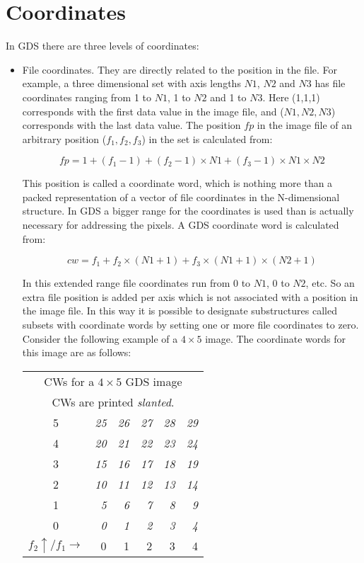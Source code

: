 \section{Coordinates}

In GDS there are three levels of coordinates:

\begin{itemize}

\item File coordinates.  They are directly related to the position in
the file.  For example, a three dimensional set with axis lengths $N1$,
$N2$ and $N3$ has file coordinates ranging from 1 to $N1$, 1 to $N2$ and
1 to $N3$.  Here (1,1,1) corresponds with the first data value in the
image file, and ($N1,N2,N3$) corresponds with the last data value.  The
position {$fp$} in the image file of an arbitrary position
($f_1,f_2,f_3$) in the set is calculated from:

$$fp = 1 + (f_1 - 1) + (f_2 - 1) \times N1 + (f_3 - 1) \times N1 \times N2$$

This position is called a coordinate word, which is nothing more than a
packed representation of a vector of file coordinates in the
N-dimensional structure.  In GDS a bigger range for the coordinates is
used than is actually necessary for addressing the pixels.  A GDS
coordinate word is calculated from:

$$cw = f_1 + f_2 \times (N1 + 1) + f_3 \times (N1 + 1) \times (N2 + 1)$$

In this extended range file coordinates run from 0 to $N1$, 0 to $N2$,
etc.  So an extra file position is added per axis which is not
associated with a position in the image file.  In this way it is
possible to designate substructures called subsets with coordinate words
by setting one or more file coordinates to zero.  Consider the following
example of a $4 \times 5$ image.  The coordinate words for this image
are as follows:

\begin{center}
\begin{tabular}{|c|r|r r r r |}
\hline
\multicolumn{6}{|c|}{CWs for a $4 \times 5$ GDS image}\\
\multicolumn{6}{|c|}{CWs are printed {\sl slanted\/}.}\\
\hline
  5 &{\sl 25\/}&{\sl 26\/}&{\sl 27\/}&{\sl 28\/}&{\sl 29\/}\\
  4 &{\sl 20\/}&{\sl 21\/}&{\sl 22\/}&{\sl 23\/}&{\sl 24\/}\\
  3 &{\sl 15\/}&{\sl 16\/}&{\sl 17\/}&{\sl 18\/}&{\sl 19\/}\\
  2 &{\sl 10\/}&{\sl 11\/}&{\sl 12\/}&{\sl 13\/}&{\sl 14\/}\\
  1 &{\sl  5\/}&{\sl  6\/}&{\sl  7\/}&{\sl  8\/}&{\sl  9\/}\\
\hline
  0 &{\sl  0\/}&{\sl  1\/}&{\sl  2\/}&{\sl  3\/}&{\sl  4\/}\\
\hline
$f_2\uparrow/f_1\rightarrow$&  0& 1& 2& 3& 4\\
\hline
\end{tabular}
\end{center}


\end{itemize}
